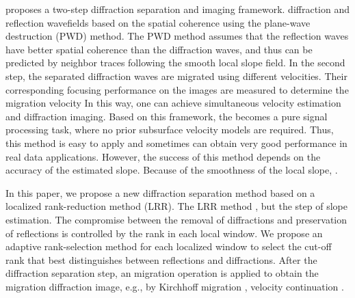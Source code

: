 \cite{fomel2007} proposes a two-step diffraction separation and imaging framework.  diffraction and reflection wavefields based on the spatial coherence using the plane-wave destruction (PWD) method. The PWD method assumes that the reflection waves have better spatial coherence than the diffraction waves, and thus can be predicted by neighbor traces following the smooth local slope field. In the second step, the separated diffraction waves are migrated using different velocities. Their corresponding focusing performance on the images are measured to determine the migration velocity  In this way, one can achieve simultaneous velocity estimation and diffraction imaging. Based on this framework, the  becomes a pure signal processing task, where no prior subsurface velocity models are required. Thus, this method is easy to apply and sometimes can obtain very good performance in real data applications.  However, the success of this method depends on  the accuracy of the estimated slope. Because of the smoothness of the local slope, .  

In this paper, we propose a new diffraction separation method based on a localized rank-reduction method (LRR). The LRR method , but  the step of slope estimation. The compromise between the removal of diffractions and preservation of reflections is controlled by the rank in each local window. We propose an adaptive rank-selection method for each localized window to select the  cut-off rank that best distinguishes between reflections and diffractions. After the diffraction separation step, an migration operation is applied to obtain the migration diffraction image, e.g., by Kirchhoff migration \cite[]{fomel2002antialiasing}, velocity continuation \cite[]{fomel20037}. 

